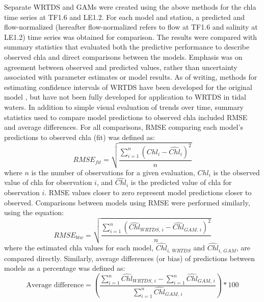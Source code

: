 \documentclass{svjour3}\usepackage[]{graphicx}\usepackage[]{color}
\begin{document}
Separate \ac{WRTDS} and \acp{GAM} were created using the above methods for the \ac{chla} time series at TF1.6 and LE1.2. For each model and station, a predicted and flow-normalized (hereafter flow-normalized refers to flow at TF1.6 and salinity at LE1.2) time series was obtained for comparison.  The results were compared with summary statistics that evaluated both the predictive performance to describe observed \ac{chla} and direct comparisons between the models.  Emphasis was on agreement between observed and predicted values, rather than uncertainty associated with parameter estimates or model results.  As of writing, methods for estimating confidence intervals of \ac{WRTDS} have been developed for the original model \cite{Hirsch15}, but have not been fully developed for application to \ac{WRTDS} in tidal waters.  In addition to simple visual evaluation of trends over time, summary statistics used to compare model predictions to observed \ac{chla} included \ac{RMSE} and average differences.  For all comparisons, \ac{RMSE} comparing each model's predictions to observed \ac{chla} (fit) was defined as:
\begin{equation}
RMSE_{fit} = \sqrt {\frac{{\sum\limits_{{i = 1}}^n {{{\left( {{Chl_i} - {\widehat{Chl}_i}} \right)}^2}} }}{n}}
\end{equation}
where $n$ is the number of observations for a given evaluation, $Chl_i$ is the observed value of \ac{chla} for observation $i$, and ${\widehat{Chl}}_i$ is the predicted value of \ac{chla} for observation $i$.  \ac{RMSE} values closer to zero represent model predictions closer to observed.  Comparisons between models using \ac{RMSE} were performed similarly, using the equation:
\begin{equation} \label{rmse_fun}
RMSE_{btw} = \sqrt {\frac{{\sum\limits_{{i = 1}}^n {{{\left( {{\widehat{Chl}_{WRTDS,\,i}} - {{\widehat{Chl}}_{GAM,\,i}}} \right)}^2}} }}{n}}
\end{equation}
where the estimated \ac{chla} values for each model, $\widehat{Chl}_{i,\,WRTDS}$ and $\widehat{Chl}_{i,\,GAM}$, are compared directly.  Similarly, average differences (or bias) of predictions between models as a percentage was defined as:
\begin{equation} \label{avediff_fun}
\textrm{Average difference} = \left(\frac{\sum\limits_{i = 1}^n \widehat{Chl}_{WRTDS,\,i} - \sum\limits_{i = 1}^n \widehat{Chl}_{GAM,\,i}}{\sum\limits_{i = 1}^n \widehat{Chl}_{GAM,\,i}}\right) * 100
\end{equation}
\end{document}

